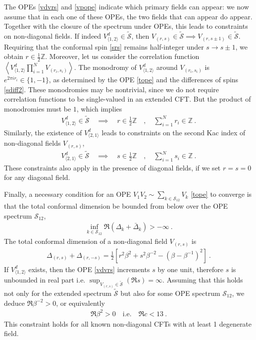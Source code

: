 \documentclass[12pt, a4paper]{article}
\theoremstyle{break}
\begin{document}
The OPEs \eqref{vdvrs} and \eqref{vpope} indicate which primary fields can appear: we now assume that in each one of these OPEs, the two fields that can appear do appear. 
Together with the closure of the spectrum under OPEs, this leads to constraints on non-diagonal fields. If indeed $V^d_{\langle 1,2\rangle}\in\widetilde{\mathcal{S}}$, then $V_{(r,s)}\in\widetilde{\mathcal{S}}\implies V_{(r,s\pm 1)}\in\widetilde{\mathcal{S}}$. 
 Requiring that the conformal spin \eqref{srs} remains half-integer under $s\to s\pm 1$, we obtain
 $r\in \frac12 \mathbb{Z}$.
Moreover, let us  consider the correlation function $\left<V^d_{\langle 1,2\rangle}\prod_{i=1}^NV_{(r_i,s_i)}\right>$. 
The monodromy of $V^d_{\langle 1,2\rangle}$  around $V_{(r_i,s_i)}$ is $e^{2\pi ir_i}\in \{1,-1\}$, as determined by the OPE \eqref{tope} and the differences of spins \eqref{sdiff2}. These monodromies may be nontrivial, since we do not require correlation functions to be single-valued in an extended CFT. 
But the product of monodromies must be $1$, which implies 
\begin{align}
 \boxed{V^d_{\langle 1,2\rangle}\in\widetilde{\mathcal{S}} \quad \implies\quad  r\in \frac12\mathbb{Z} \quad , \quad \sum_{i=1}^N r_i  \in \mathbb{Z}}\ . 
 \label{sriz}
\end{align}
Similarly, the existence of $V^d_{\langle 2,1\rangle}$ leads to constraints on the second Kac index of non-diagonal fields $V_{(r,s)}$,
\begin{align}
 \boxed{V^d_{\langle 2,1\rangle}\in\widetilde{\mathcal{S}} \quad \implies\quad  s\in \frac12\mathbb{Z} \quad , \quad \sum_{i=1}^N s_i  \in \mathbb{Z}}\ . 
 \label{ssiz}
\end{align}
These constraints also apply in the presence of diagonal fields, if we set $r=s=0$ for any diagonal field. 

Finally, a necessary condition for an OPE $V_1V_2\sim \sum_{k\in\mathcal{S}_{12}}V_k$ \eqref{tope} to converge is that the total conformal dimension be bounded from below over the OPE spectrum $\mathcal{S}_{12}$,
\begin{align}
 \boxed{\inf_{k\in \mathcal{S}_{12}}\Re\left(\Delta_k+\bar\Delta_k\right) > -\infty} \ . 
 \label{iddb}
\end{align}
The total conformal dimension of a non-diagonal field $V_{(r,s)}$ is 
\begin{align}
 \Delta_{(r,s)}+\Delta_{(r,-s)} = \frac12\left[ r^2\beta^{2} + s^2\beta^{-2}  -\left(\beta-\beta^{-1}\right)^2\right]\ .
\end{align}
If $V^d_{\langle 1,2\rangle}$ exists, then the OPE \eqref{vdvrs} increments $s$ by one unit, therefore $s$ is unbounded in real part i.e. $\sup_{V_{(r,s)}\in \widetilde{\mathcal{S}}} \left(\Re s\right) = \infty$. Assuming that this holds not only for the extended spectrum $\widetilde{\mathcal{S}}$ but also for some OPE spectrum $\mathcal{S}_{12}$, we deduce $\Re\beta^{-2}>0$, or equivalently 
\begin{align}
 \boxed{\Re\beta^2 > 0 \quad \text{i.e.} \quad \Re c < 13}\ .
 \label{rbp}
\end{align}
This constraint holds for all known non-diagonal CFTs with at least 1 degenerate field. 
\end{document}
